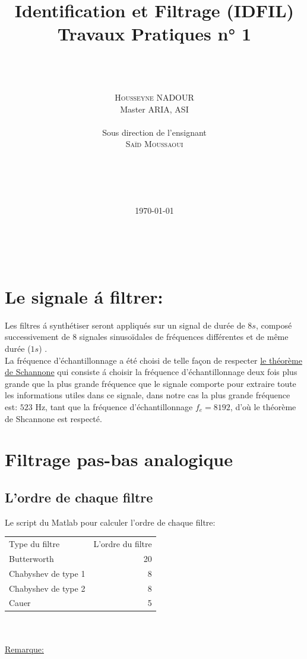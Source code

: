 \documentclass[twoside,twocolumn]{article}
\title{Identification et Filtrage (IDFIL)  Travaux Pratiques n° 1} %
\author{%
\noindent\rule{6cm}{1pt} \\ \\
\LARGE
\textsc{Housseyne NADOUR}\\[1ex] %
\normalsize Master ARIA, ASI \\ %
\\
\normalsize Sous direction de l'ensignant \\ %
\LARGE
\textsc{Saïd Moussaoui}\\[1ex] %
\noindent\rule{6cm}{1pt} \\ \\
}
\date{\today}
\begin{document}
\maketitle
\
\tableofcontents

\section{Le signale á filtrer:}

Les filtres á synthétiser seront appliqués sur un signal de durée de $8s$, composé successivement de 8 signales sinusoïdales de fréquences différentes et de même durée ($1s$) .\\
La fréquence d'échantillonnage a été choisi de telle façon de respecter \underline {le théorème de Schannone} qui consiste á choisir la fréquence d'échantillonnage deux fois plus grande que la plus grande fréquence que le signale comporte pour extraire toute les informations utiles dans ce signale, dans notre cas la plus grande fréquence est: $523$ Hz, tant que la fréquence d'échantillonnage $f_e = 8192$, d'où le théorème de Shcannone est respecté.

\section{Filtrage pas-bas analogique}
\subsection{L'ordre de chaque filtre}
Le script du Matlab pour calculer l'ordre de chaque filtre:

\label{matlab}


\begin{tabular}{l|r}
Type du filtre & L'ordre du filtre \\
Butterworth & 20 \\
Chabyshev de type 1 & 8\\
Chabyshev de type 2 & 8\\
Cauer &  5\\
\end{tabular}
\\
\\
\underline{Remarque:}\\
\end{document}

